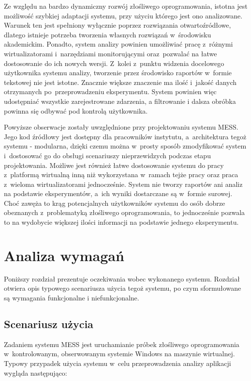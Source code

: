 \documentclass[a4paper,12pt,oneside]{article}
\begin{document}
	Ze względu na bardzo dynamiczny rozwój złośliwego oprogramowania, istotna jest możliwość szybkiej adaptacji systemu, przy użyciu którego jest ono analizowane. Warunek ten jest spełniony wyłącznie poprzez rozwiązania otwartoźródłowe, dlatego istnieje potrzeba tworzenia własnych rozwiązań w~środowisku akademickim. Ponadto, system analizy powinien umożliwiać pracę z~różnymi wirtualizatorami i~narzędziami monitorującymi oraz~pozwalać na łatwe dostosowanie do ich nowych wersji. Z~kolei z~punktu widzenia docelowego użytkownika systemu analizy, tworzenie przez środowisko raportów w~formie tekstowej nie jest istotne. Znacznie większe znaczenie ma ilość i~jakość danych otrzymanych po~przeprowadzeniu eksperymentu. System powinien więc udostępniać wszystkie zarejestrowane zdarzenia, a filtrowanie i dalsza obróbka powinna się odbywać pod kontrolą użytkownika. 
	
	Powyższe obserwacje zostały uwzględnione przy projektowaniu systemu MESS. Jego kod źródłowy jest dostępny dla pracowników instytutu, a~architektura tegoż systemu - modularna, dzięki czemu można w~prosty sposób zmodyfikować system i~dostosować go do obsługi scenariuszy nieprzewidzych podczas etapu projektowania. Możliwe jest również łatwe dostosowanie systemu do pracy z~platformą wirtualną inną niż wykorzystana w~ramach tejże pracy oraz praca z~wieloma wirtualizatorami jednocześnie. System nie tworzy raportów ani analiz na podstawie eksperymentów, a~ich wyniki dostarczane są w~formie surowej. Choć zawęża to krąg potencjalnych użytkowników systemu do osób dobrze obeznanych z~problematyką złośliwego oprogramowania, to jednocześnie pozwala to na wydobycie większej ilości informacji na podstawie jednego eksperymentu.
	
	\clearpage
	\newpage
	
	\section{Analiza wymagań}	

	Poniższy rozdział prezentuje oczekiwania wobec wykonanego systemu. Rozdział otwiera opis typowego scenariusza użycia tegoż systemu, po czym sformułowane są wymagania funkcjonalne i niefunkcjonalne.
		
	\subsection{Scenariusz użycia}
	
	Zadaniem systemu MESS jest uruchamianie próbek złośliwego oprogramowania w~kontrolowanym, obserwowanym systemie Windows na maszynie wirtualnej. Typowy przypadek użycia systemu w~celu przeprowadzenia analizy aplikacji wygląda następująco:
	
\end{document}
